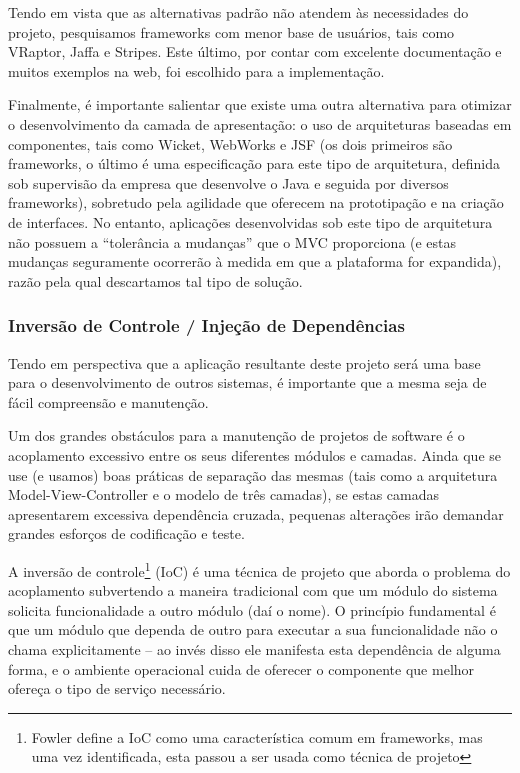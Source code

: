 \documentclass{abnt}
\begin{document}
Tendo em vista que as alternativas padrão não atendem às necessidades do projeto, pesquisamos frameworks com menor base de usuários, tais como VRaptor, Jaffa e Stripes. Este último, por contar com excelente documentação e muitos exemplos na web, foi escolhido para a implementação.

Finalmente, é importante salientar que existe uma outra alternativa para otimizar o desenvolvimento da camada de apresentação: o uso de arquiteturas baseadas em componentes, tais como Wicket, WebWorks e JSF (os dois primeiros são frameworks, o último é uma especificação para este tipo de arquitetura, definida sob supervisão da empresa que desenvolve o Java e seguida por diversos frameworks), sobretudo pela agilidade que oferecem na prototipação e na criação de interfaces. No entanto, aplicações desenvolvidas sob este tipo de arquitetura não possuem a “tolerância a mudanças” que o MVC proporciona (e estas mudanças seguramente ocorrerão à medida em que a plataforma for expandida), razão pela qual descartamos tal tipo de solução.

\subsubsection{Inversão de Controle / Injeção de Dependências}

Tendo em perspectiva que a aplicação resultante deste projeto será uma base para o desenvolvimento de outros sistemas, é importante que a mesma seja de fácil compreensão e manutenção.

Um dos grandes obstáculos para a manutenção de projetos de software é o acoplamento excessivo entre os seus diferentes módulos e camadas. Ainda que se use (e usamos) boas práticas de separação das mesmas (tais como a arquitetura Model-View-Controller e o modelo de três camadas), se estas camadas apresentarem excessiva dependência cruzada, pequenas alterações irão demandar grandes esforços de codificação e teste.

A inversão de controle\footnote{Fowler\cite{FowlerIoc} define a IoC como uma característica comum em frameworks, mas uma vez identificada, esta passou a ser usada como técnica de projeto } (IoC) é uma técnica de projeto que aborda o problema do acoplamento subvertendo a maneira tradicional com que um módulo do sistema solicita funcionalidade a outro módulo (daí o nome). O princípio fundamental é que um módulo que dependa de outro para executar a sua funcionalidade não o chama explicitamente – ao invés disso ele manifesta esta dependência de alguma forma, e o ambiente operacional cuida de oferecer o componente que melhor ofereça o tipo de serviço necessário.
\end{document}
